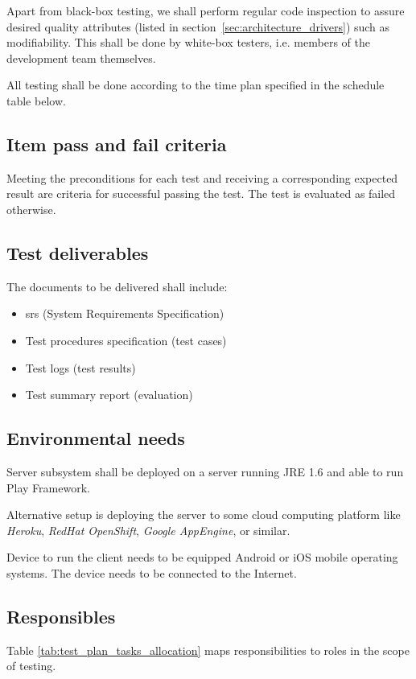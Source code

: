 \documentclass[11pt]{book}
\begin{document}
Apart from black-box testing, we shall perform regular code inspection to assure desired quality attributes (listed in section~\ref{sec:architecture_drivers}) such as modifiability. This shall be done by white-box testers, i.e. members of the development team themselves.

All testing shall be done according to the time plan specified in the schedule table below.

\subsection{Item pass and fail criteria}
Meeting the preconditions for each test and receiving a corresponding expected result are criteria for successful passing the test. The test is evaluated as failed otherwise.

\subsection{Test deliverables}
The documents to be delivered shall include:

\begin{itemize}
    \item \gls{srs} (System Requirements Specification)
    \item Test procedures specification (test cases)
    \item Test logs (test results)
    \item Test summary report (evaluation)
\end{itemize}

\subsection{Environmental needs}
Server subsystem shall be deployed on a server running JRE 1.6 and able to run Play Framework.

Alternative setup is deploying the server to some cloud computing platform like \emph{Heroku}, \emph{RedHat OpenShift}, \emph{Google AppEngine}, or similar. 

Device to run the client needs to be equipped Android or iOS mobile operating systems. The device needs to be connected to the Internet.

\subsection{Responsibles}

Table \ref{tab:test_plan_tasks_allocation} maps responsibilities to roles in the scope of testing.
\end{document}
